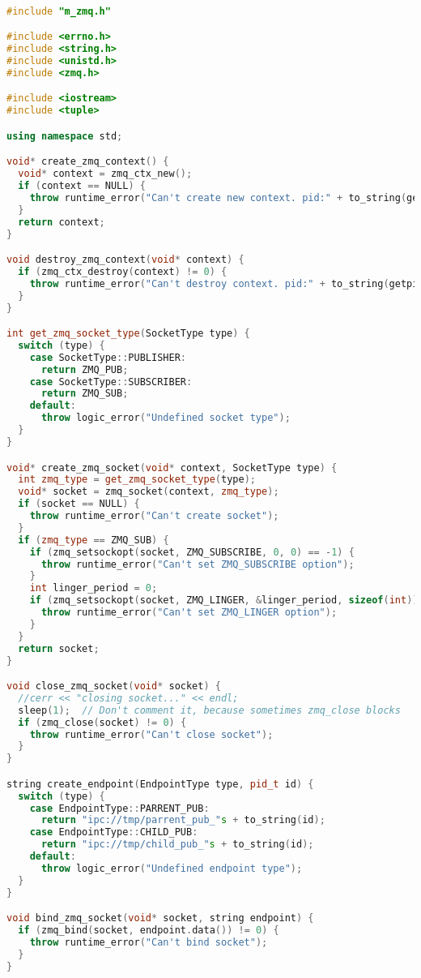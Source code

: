 \begin{lstlisting}[language=C++]

#include "m_zmq.h"

#include <errno.h>
#include <string.h>
#include <unistd.h>
#include <zmq.h>

#include <iostream>
#include <tuple>

using namespace std;

void* create_zmq_context() {
  void* context = zmq_ctx_new();
  if (context == NULL) {
    throw runtime_error("Can't create new context. pid:" + to_string(getpid()));
  }
  return context;
}

void destroy_zmq_context(void* context) {
  if (zmq_ctx_destroy(context) != 0) {
    throw runtime_error("Can't destroy context. pid:" + to_string(getpid()));
  }
}

int get_zmq_socket_type(SocketType type) {
  switch (type) {
    case SocketType::PUBLISHER:
      return ZMQ_PUB;
    case SocketType::SUBSCRIBER:
      return ZMQ_SUB;
    default:
      throw logic_error("Undefined socket type");
  }
}

void* create_zmq_socket(void* context, SocketType type) {
  int zmq_type = get_zmq_socket_type(type);
  void* socket = zmq_socket(context, zmq_type);
  if (socket == NULL) {
    throw runtime_error("Can't create socket");
  }
  if (zmq_type == ZMQ_SUB) {
    if (zmq_setsockopt(socket, ZMQ_SUBSCRIBE, 0, 0) == -1) {
      throw runtime_error("Can't set ZMQ_SUBSCRIBE option");
    }
    int linger_period = 0;
    if (zmq_setsockopt(socket, ZMQ_LINGER, &linger_period, sizeof(int)) == -1) {
      throw runtime_error("Can't set ZMQ_LINGER option");
    }
  }
  return socket;
}

void close_zmq_socket(void* socket) {
  //cerr << "closing socket..." << endl;
  sleep(1);  // Don't comment it, because sometimes zmq_close blocks
  if (zmq_close(socket) != 0) {
    throw runtime_error("Can't close socket");
  }
}

string create_endpoint(EndpointType type, pid_t id) {
  switch (type) {
    case EndpointType::PARRENT_PUB:
      return "ipc://tmp/parrent_pub_"s + to_string(id);
    case EndpointType::CHILD_PUB:
      return "ipc://tmp/child_pub_"s + to_string(id);
    default:
      throw logic_error("Undefined endpoint type");
  }
}

void bind_zmq_socket(void* socket, string endpoint) {
  if (zmq_bind(socket, endpoint.data()) != 0) {
    throw runtime_error("Can't bind socket");
  }
}


\end{lstlisting}
